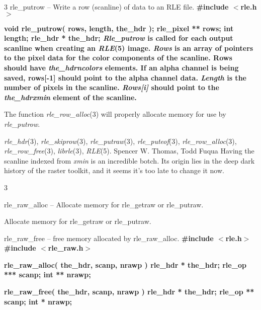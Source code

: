 %
%
%
 3
rle\_putrow -- Write a row (scanline) of data to an RLE file.
\bf
\#include $<$rle.h$>$
\par\vspace{1.0\baselineskip}
\bf
void rle\_putrow( rows, length, the\_hdr );
\nwl
\bf
rle\_pixel ** rows;
\nwl
\bf
int length;
\nwl
\bf
rle\_hdr * the\_hdr;
{\it Rle\_putrow}
is called for each output scanline when creating an
{\it RLE}{\rm (5)}
image.  
{\it Rows}
is an array of pointers to the pixel data for the color components of
the scanline.  Rows should have 
{\it the\_hdr}{\rm }{\it ncolors}
elements.  If an alpha channel is being saved, rows[-1] should point to the
alpha channel data.
{\it Length}
is the number of pixels in the scanline.  
{\it Rows[i]}
should point to the 
{\it the\_hdr}{\rm }{\it xmin}
element of the scanline.

The function
{\it rle\_row\_alloc}{\rm (3)}
will properly allocate memory for use by 
{\it rle\_putrow}{\rm .}
\raggedright
{\it rle\_hdr}{\rm (3),}
{\it rle\_skiprow}{\rm (3),}
{\it rle\_putraw}{\rm (3),}
{\it rle\_puteof}{\rm (3),}
{\it rle\_row\_alloc}{\rm (3),}
{\it rle\_row\_free}{\rm (3),}
{\it librle}{\rm (3),}
{\it RLE}{\rm (5).}
Spencer W. Thomas, Todd Fuqua
Having the scanline indexed from 
{\it xmin}
is an incredible botch.  Its origin lies in the deep dark history of
the raster toolkit, and it seems it's too late to change it now.
\newpage


%
%
%
 3
\begin{TPlist}{rle\_raw\_alloc -- Allocate memory for rle\_getraw or rle\_putraw.}
\item[{rle\_raw\_alloc --}] Allocate memory for rle\_getraw or rle\_putraw.
\end{TPlist}\par\noindent
rle\_raw\_free -- free memory allocated by rle\_raw\_alloc.
\bf
\#include $<$rle.h$>$
\nwl
\bf
\#include $<$rle\_raw.h$>$
\par\vspace{1.0\baselineskip}
\bf
rle\_raw\_alloc( the\_hdr, scanp, nrawp )
\nwl
\bf
rle\_hdr * the\_hdr;
\nwl
\bf
rle\_op *** scanp;
\nwl
\bf
int ** nrawp;
\par\vspace{1.0\baselineskip}
\bf
rle\_raw\_free( the\_hdr, scanp, nrawp )
\nwl
\bf
rle\_hdr * the\_hdr;
\nwl
\bf
rle\_op ** scanp;
\nwl
\bf
int * nrawp;

